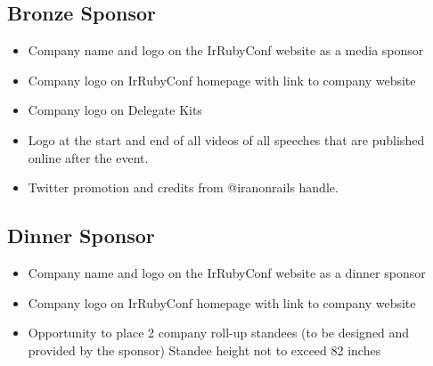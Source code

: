 \documentclass[a4paper,12pt]{article}
\begin{document}
\subsection*{Bronze Sponsor}
\label{subsec:label}
\begin{itemize}
\item{Company name and logo on the IrRubyConf website as a media sponsor}
\item{Company logo on IrRubyConf homepage with link to company website }
\item{Company logo on Delegate Kits}
\item{Logo at the start and end of all videos of all speeches that are published
  online after the event.}
\item{Twitter promotion and credits from @iranonrails handle.}
\end{itemize}

\subsection*{Dinner Sponsor}
\label{subsec:label}
\begin{itemize}
\item{Company name and logo on the IrRubyConf website as a dinner sponsor}
\item{Company logo on IrRubyConf homepage with link to company website}
\item{Opportunity to place 2 company roll-up standees (to be designed and provided by the sponsor)
  Standee height not to exceed 82 inches}
\end{itemize}
\end{document}
